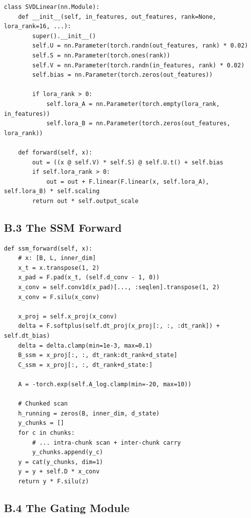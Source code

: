 \begin{lstlisting}
class SVDLinear(nn.Module):
    def __init__(self, in_features, out_features, rank=None, lora_rank=16, ...):
        super().__init__()
        self.U = nn.Parameter(torch.randn(out_features, rank) * 0.02)
        self.S = nn.Parameter(torch.ones(rank))
        self.V = nn.Parameter(torch.randn(in_features, rank) * 0.02)
        self.bias = nn.Parameter(torch.zeros(out_features))
        
        if lora_rank > 0:
            self.lora_A = nn.Parameter(torch.empty(lora_rank, in_features))
            self.lora_B = nn.Parameter(torch.zeros(out_features, lora_rank))
    
    def forward(self, x):
        out = ((x @ self.V) * self.S) @ self.U.t() + self.bias
        if self.lora_rank > 0:
            out = out + F.linear(F.linear(x, self.lora_A), self.lora_B) * self.scaling
        return out * self.output_scale
\end{lstlisting}

\subsection{B.3 The SSM Forward}

\begin{lstlisting}
def ssm_forward(self, x):
    # x: [B, L, inner_dim]
    x_t = x.transpose(1, 2)
    x_pad = F.pad(x_t, (self.d_conv - 1, 0))
    x_conv = self.conv1d(x_pad)[..., :seqlen].transpose(1, 2)
    x_conv = F.silu(x_conv)
    
    x_proj = self.x_proj(x_conv)
    delta = F.softplus(self.dt_proj(x_proj[:, :, :dt_rank]) + self.dt_bias)
    delta = delta.clamp(min=1e-3, max=0.1)
    B_ssm = x_proj[:, :, dt_rank:dt_rank+d_state]
    C_ssm = x_proj[:, :, dt_rank+d_state:]
    
    A = -torch.exp(self.A_log.clamp(min=-20, max=10))
    
    # Chunked scan
    h_running = zeros(B, inner_dim, d_state)
    y_chunks = []
    for c in chunks:
        # ... intra-chunk scan + inter-chunk carry
        y_chunks.append(y_c)
    y = cat(y_chunks, dim=1)
    y = y + self.D * x_conv
    return y * F.silu(z)
\end{lstlisting}

\subsection{B.4 The Gating Module}


